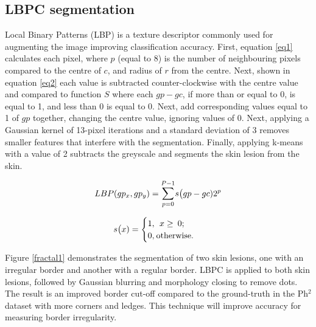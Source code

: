 \subsection{LBPC segmentation}

Local Binary Patterns (LBP) is a texture descriptor commonly used for augmenting the image improving classification accuracy\cite{Pereira2020, Kaya2016}. First, equation \ref{eq1} calculates each pixel, where $p$ (equal to 8) is the number of neighbouring pixels compared to the centre of $c$, and radius of $r$ from the centre. Next, shown in equation \ref{eq2} each value is subtracted counter-clockwise with the centre value and compared to function $S$ where each $gp - gc$, if more than or equal to 0, is equal to 1, and less than 0 is equal to 0. Next, add corresponding values equal to 1 of $gp$ together, changing the centre value, ignoring values of 0. Next, applying a Gaussian kernel of 13-pixel iterations and a standard deviation of 3 removes smaller features that interfere with the segmentation. Finally, applying k-means with a value of 2 subtracts the greyscale and segments the skin lesion from the skin.

\begin{equation} \label{eq1}
LBP(gp_x, gp_y) = \mathlarger{\sum}_{p=0}^{P-1}s\big(gp - gc)2^p
\end{equation}

\begin{equation} \label{eq2}
s\big(x) = 
\begin{cases}
1,\:\:x\geq\:0; \\
0,\:$otherwise$.
\end{cases}
\end{equation}

Figure \ref{fractal1} demonstrates the segmentation of two skin lesions, one with an irregular border and another with a regular border. LBPC is applied to both skin lesions, followed by Gaussian blurring and morphology closing to remove dots. The result is an improved border cut-off compared to the ground-truth in the Ph$^2$ dataset with more corners and ledges. This technique will improve accuracy for measuring border irregularity\cite{Pereira2020}.


